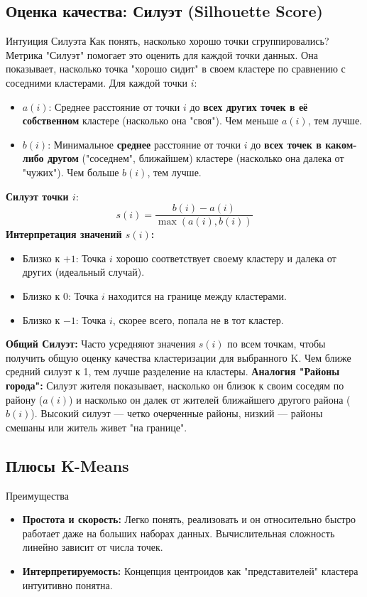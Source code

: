 \subsection{Оценка качества: Силуэт (Silhouette Score)}
\begin{myexampleblock}{Интуиция Силуэта}
    Как понять, насколько хорошо точки сгруппировались? Метрика "Силуэт" помогает это оценить для каждой точки данных. Она показывает, насколько точка "хорошо сидит" в своем кластере по сравнению с соседними кластерами.
    \vspace{0.5ex}
    Для каждой точки $i$:
    \begin{itemize}
        \item $a(i)$: Среднее расстояние от точки $i$ до \textbf{всех других точек в её собственном} кластере (насколько она "своя"). Чем меньше $a(i)$, тем лучше.
        \item $b(i)$: Минимальное \textbf{среднее} расстояние от точки $i$ до \textbf{всех точек в каком-либо другом} ("соседнем", ближайшем) кластере (насколько она далека от "чужих"). Чем больше $b(i)$, тем лучше.
    \end{itemize}
    \textbf{Силуэт точки $i$}: \[ s(i) = \frac{b(i) - a(i)}{\max(a(i), b(i))} \]
    \textbf{Интерпретация значений $s(i)$:}
    \begin{itemize}
        \item Близко к $+1$: Точка $i$ хорошо соответствует своему кластеру и далека от других (идеальный случай).
        \item Близко к $0$: Точка $i$ находится на границе между кластерами.
        \item Близко к $-1$: Точка $i$, скорее всего, попала не в тот кластер.
    \end{itemize}
    \textbf{Общий Силуэт:} Часто усредняют значения $s(i)$ по всем точкам, чтобы получить общую оценку качества кластеризации для выбранного K. Чем ближе средний силуэт к 1, тем лучше разделение на кластеры.
    \vspace{0.5ex}
    \textbf{Аналогия "Районы города":} Силуэт жителя показывает, насколько он близок к своим соседям по району ($a(i)$) и насколько он далек от жителей ближайшего другого района ($b(i)$). Высокий силуэт — четко очерченные районы, низкий — районы смешаны или житель живет "на границе".
\end{myexampleblock}

\subsection{Плюсы K-Means}
\begin{textbox}{Преимущества}
    \begin{itemize}
        \item \textbf{Простота и скорость:} Легко понять, реализовать и он относительно быстро работает даже на больших наборах данных. Вычислительная сложность линейно зависит от числа точек.
        \item \textbf{Интерпретируемость:} Концепция центроидов как "представителей" кластера интуитивно понятна.
    \end{itemize}
\end{textbox}

